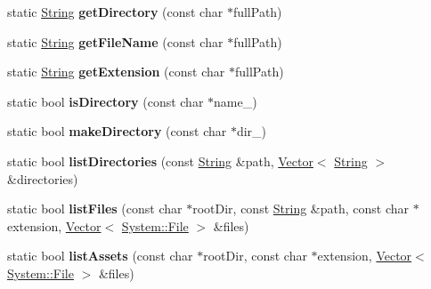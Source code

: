 \begin{DoxyCompactItemize}
\item 
static \hyperlink{class_magnum_1_1_string}{String} {\bfseries get\+Directory} (const char $\ast$full\+Path)\hypertarget{class_magnum_1_1_system_abd846b013a800d9fcd8a4f916e2026f2}{}\label{class_magnum_1_1_system_abd846b013a800d9fcd8a4f916e2026f2}

\item 
static \hyperlink{class_magnum_1_1_string}{String} {\bfseries get\+File\+Name} (const char $\ast$full\+Path)\hypertarget{class_magnum_1_1_system_aa7fb6455a059789dd5e4bb333327f139}{}\label{class_magnum_1_1_system_aa7fb6455a059789dd5e4bb333327f139}

\item 
static \hyperlink{class_magnum_1_1_string}{String} {\bfseries get\+Extension} (const char $\ast$full\+Path)\hypertarget{class_magnum_1_1_system_a7dac7fcbbaff6b6e16e68209eaf25c05}{}\label{class_magnum_1_1_system_a7dac7fcbbaff6b6e16e68209eaf25c05}

\item 
static bool {\bfseries is\+Directory} (const char $\ast$name\+\_\+)\hypertarget{class_magnum_1_1_system_aed72765800d117c178ff3c846abd813b}{}\label{class_magnum_1_1_system_aed72765800d117c178ff3c846abd813b}

\item 
static bool {\bfseries make\+Directory} (const char $\ast$dir\+\_\+)\hypertarget{class_magnum_1_1_system_abfc5bc6c40fc568b79008fc4bf64fa54}{}\label{class_magnum_1_1_system_abfc5bc6c40fc568b79008fc4bf64fa54}

\item 
static bool {\bfseries list\+Directories} (const \hyperlink{class_magnum_1_1_string}{String} \&path, \hyperlink{class_magnum_1_1_vector}{Vector}$<$ \hyperlink{class_magnum_1_1_string}{String} $>$ \&directories)\hypertarget{class_magnum_1_1_system_abd7aed6e3777db04a46045adb9333771}{}\label{class_magnum_1_1_system_abd7aed6e3777db04a46045adb9333771}

\item 
static bool {\bfseries list\+Files} (const char $\ast$root\+Dir, const \hyperlink{class_magnum_1_1_string}{String} \&path, const char $\ast$extension, \hyperlink{class_magnum_1_1_vector}{Vector}$<$ \hyperlink{class_magnum_1_1_system_1_1_file}{System\+::\+File} $>$ \&files)\hypertarget{class_magnum_1_1_system_a26f078a49a4369626fb039ddc781fb9e}{}\label{class_magnum_1_1_system_a26f078a49a4369626fb039ddc781fb9e}

\item 
static bool {\bfseries list\+Assets} (const char $\ast$root\+Dir, const char $\ast$extension, \hyperlink{class_magnum_1_1_vector}{Vector}$<$ \hyperlink{class_magnum_1_1_system_1_1_file}{System\+::\+File} $>$ \&files)\hypertarget{class_magnum_1_1_system_a580d87e327d337b9bf696bb3ab6176cb}{}\label{class_magnum_1_1_system_a580d87e327d337b9bf696bb3ab6176cb}

\end{DoxyCompactItemize}


